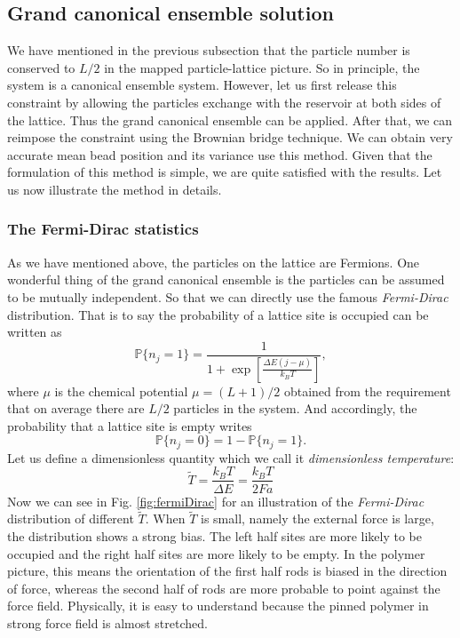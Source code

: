 \subsection{Grand canonical ensemble solution}
\label{sub:grand_canonical_ensemble_solution}
We have mentioned in the previous subsection that the particle number is conserved to $L/2$ in the mapped particle-lattice picture. So in principle, the system is a canonical ensemble system. However, let us first release this constraint by allowing the particles exchange with the reservoir at both sides of the lattice. Thus the grand canonical ensemble can be applied. After that, we can reimpose the constraint using the Brownian bridge technique. We can obtain very accurate mean bead position and its variance use this method. Given that the formulation of this method is simple, we are quite satisfied with the results. Let us now illustrate the method in details.

\subsubsection{The Fermi-Dirac statistics}
\label{ssub:The Fermi-Dirac Statistics}

As we have mentioned above, the particles on the lattice are Fermions. One wonderful thing of the grand canonical ensemble is the particles can be assumed to be mutually independent. So that we can directly use the famous \emph{Fermi-Dirac} distribution. That is to say the probability of a lattice site is occupied can be written as
\begin{equation}
    \label{eq:fermiDirac}
    \mathbb{P}\{n_j=1\} = \frac{1}{1+\exp\left[\frac{\Delta E (j - \mu)}{k_B T}\right]},
\end{equation}
where $\mu$ is the chemical potential $\mu = (L+1)/2$ obtained from the requirement that on average there are $L/2$ particles in the system. And accordingly, the probability that a lattice site is empty writes
\begin{equation}
    \label{eq:probEmpty}
    \mathbb{P}\{n_j=0\} = 1 - \mathbb{P}\{n_j=1\}.
\end{equation}
Let us define a dimensionless quantity which we call it \emph{dimensionless temperature}:
\begin{equation}
    \label{eq:dimensionlessT}
    \tilde{T} = \frac{k_B T }{\Delta E} = \frac{k_B T}{2Fa}
\end{equation}
Now we can see in Fig. \ref{fig:fermiDirac} for an illustration of the \emph{Fermi-Dirac} distribution of different $\tilde{T}$. When $\tilde{T}$ is small, namely the external force is large, the distribution shows a strong bias. The left half sites are more likely to be occupied and the right half sites are more likely to be empty. In the polymer picture, this means the orientation of the first half rods is biased in the direction of force, whereas the second half of rods are more probable to point against the force field. Physically, it is easy to understand because the pinned polymer in strong force field is almost stretched.

